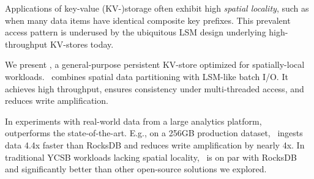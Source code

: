 Applications of key-value (KV-)storage often exhibit high \emph{spatial locality}, such as  
when many data items have identical composite key prefixes.  
This prevalent access pattern is underused by the ubiquitous LSM  design underlying 
high-throughput KV-stores today.

We present \sys, a general-purpose persistent KV-store optimized for spatially-local %
workloads. 
\sys\ combines spatial data partitioning with LSM-like  batch I/O. 
It achieves high throughput, 
ensures consistency under multi-threaded access,   
and reduces write amplification. 

In experiments with real-world data from a large analytics platform,  \sys\  
outperforms the state-of-the-art. E.g., on a 256GB production dataset, 
\sys\ ingests data 4.4x faster than RocksDB  %
and reduces write amplification by nearly 4x. 
In traditional YCSB workloads lacking spatial locality, %
\sys\ is on par with RocksDB and significantly better than other open-source solutions we explored.
